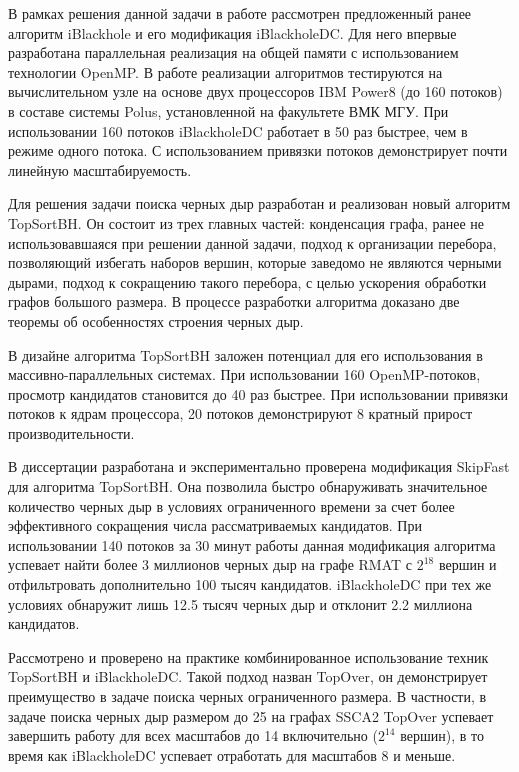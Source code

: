 \documentclass[12pt,a4paper,oneside,openany]{article}
\theoremstyle{definition}
\theoremstyle{lemma}
\theoremstyle{remark}
\begin{document}
В рамках решения данной задачи в работе рассмотрен предложенный ранее алгоритм iBlackhole и его модификация
iBlackholeDC. Для него впервые разработана параллельная реализация на общей памяти с использованием технологии OpenMP. В работе реализации алгоритмов тестируются на вычислительном узле на основе двух процессоров IBM Power8 (до 160 потоков) в составе системы Polus, установленной на факультете ВМК МГУ.
При использовании 160 потоков iBlackholeDC 
работает в 50 раз быстрее, чем в режиме одного потока. С использованием привязки потоков демонстрирует
почти линейную масштабируемость.

Для решения задачи поиска черных дыр разработан и реализован новый алгоритм TopSortBH.
Он состоит из трех главных частей: конденсация графа, ранее не
использовавшаяся при решении данной задачи, подход к организации перебора,
позволяющий избегать наборов вершин, которые заведомо не являются черными дырами,
подход к сокращению такого перебора, с целью ускорения обработки графов большого размера.
В процессе разработки алгоритма доказано две теоремы об особенностях строения черных дыр.

В дизайне алгоритма TopSortBH заложен потенциал для его использования в \\
массивно-параллельных системах. 
При использовании 160 OpenMP-потоков, просмотр кандидатов становится до 40 раз быстрее.
При использовании привязки потоков к ядрам процессора, 20 потоков демонстрируют 8 кратный прирост производительности.

В диссертации разработана и экспериментально проверена модификация SkipFast для алгоритма TopSortBH. Она позволила быстро
обнаруживать значительное количество черных дыр в условиях ограниченного времени за счет более эффективного сокращения числа рассматриваемых кандидатов.
При использовании 140 потоков за 30 минут работы данная модификация алгоритма успевает найти более 3 миллионов черных дыр на графе RMAT с $2^{18}$ вершин и
отфильтровать дополнительно 100 тысяч кандидатов. iBlackholeDC при тех же условиях обнаружит лишь 12.5 тысяч черных дыр и отклонит 2.2 миллиона кандидатов.

Рассмотрено и проверено на практике комбинированное использование техник \\ TopSortBH и iBlackholeDC.
Такой подход назван TopOver, он демонстрирует преимущество в задаче поиска черных ограниченного размера.
В частности, в задаче поиска черных дыр размером до 25 на графах SSCA2 TopOver успевает
завершить работу для всех масштабов до 14 включительно ($2^{14}$ вершин), в то время как iBlackholeDC успевает отработать для масштабов 8 и меньше.
\end{document}
